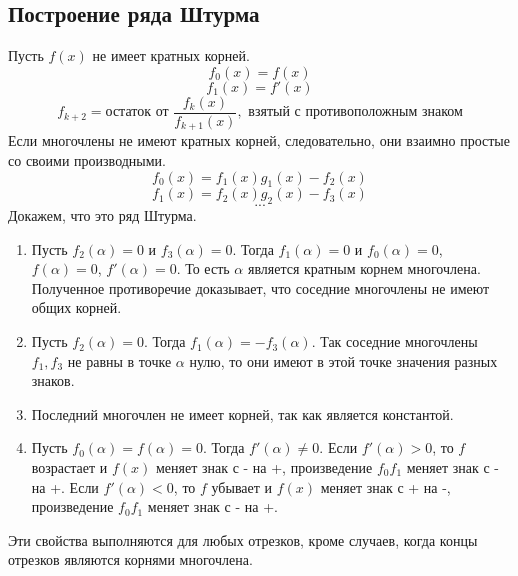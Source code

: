 \documentclass[12pt]{article}
\begin{document}
\subsection{Построение ряда Штурма}
\indent \indent Пусть $f(x)$ не имеет кратных корней.
$$f_0(x) = f(x)$$
$$f_1(x) = f'(x)$$
$$f_{k+2} = \text{остаток от }\frac{f_k(x)}{f_{k+1}(x)}, \text{ взятый с противоположным знаком}$$
\indent Если многочлены не имеют кратных корней, следовательно, они взаимно простые со своими производными.
$$f_0(x) = f_1(x)g_1(x) - f_2(x)$$
$$f_1(x) = f_2(x)g_2(x) - f_3(x)$$
$$...$$
\indent Докажем, что это ряд Штурма.
\begin{enumerate}
\item Пусть $f_2(\alpha) = 0$ и $f_3(\alpha) = 0$. Тогда $f_1(\alpha) = 0$ и $f_0(\alpha) = 0$, $f(\alpha) = 0$, $f'(\alpha) = 0$.
То есть $\alpha$ является кратным корнем многочлена. Полученное противоречие доказывает, что соседние многочлены не имеют общих корней.
\item Пусть $f_2(\alpha) = 0$. Тогда $f_1(\alpha) = -f_3(\alpha)$. Так соседние многочлены $f_1, f_3$ не равны в точке $\alpha$ нулю, то они имеют в этой точке значения разных знаков.
\item Последний многочлен не имеет корней, так как является константой.
\item Пусть $f_0(\alpha) = f(\alpha) = 0$. Тогда $f'(\alpha) \neq 0$. Если $f'(\alpha) > 0$, то $f$ возрастает и $f(x)$ меняет знак с - на +, произведение $f_0f_1$ меняет знак с - на +. Если $f'(\alpha) < 0$, то $f$ убывает и $f(x)$ меняет знак с + на -, произведение $f_0f_1$ меняет знак с - на +.
\end{enumerate}
\indent Эти свойства выполняются для любых отрезков, кроме случаев, когда концы отрезков являются корнями многочлена.
\end{document}
